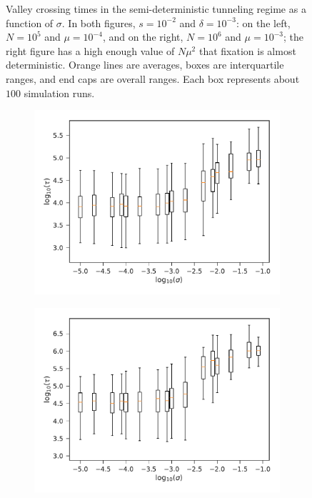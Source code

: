 \documentclass[rmp]{revtex4}
\begin{document}
\begin{spacing}{1.5}
\begin{figure}[t]
\begin{subfigure}[b]{0.4\textwidth}
\end{subfigure}
\caption{Valley crossing times in the semi-deterministic tunneling regime as a function of $\sigma$. In both figures, $s = 10^{-2}$ and $\delta = 10^{-3}$: on the left, $N = 10^5$ and $\mu = 10^{-4}$, and on the right, $N = 10^6$ and $\mu = 10^{-3}$; the right figure has a high enough value of $N\mu^2$ that fixation is almost deterministic. Orange lines are averages, boxes are interquartile ranges, and end caps are overall ranges. Each box represents about $100$ simulation runs.}
\label{fig:deterministic}
\end{figure}

\begin{figure}[t]
\begin{subfigure}[b]{0.4\textwidth}
\includegraphics[width=\textwidth]{Figures/seq_fix.pdf}
\end{subfigure}
\begin{subfigure}[b]{0.4\textwidth}
\includegraphics[width=\textwidth]{Figures/neut_tunnel.pdf}

\end{subfigure}
\end{figure}
\end{spacing}
\end{document}
